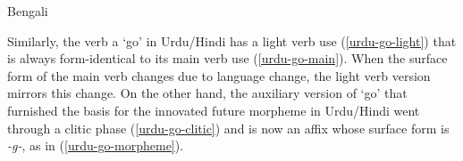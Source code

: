 \documentclass[output=paper,hidelinks]{langscibook}
\begin{document}
\begin{exe} 
\ex \label{bangla-be} Bengali
\begin{xlist}
\end{xlist}
\end{exe}

Similarly, the verb {\textdyoghlig}a `go' in Urdu/Hindi has a light verb use (\ref{urdu-go-light}) that is always form-identical to its main verb use (\ref{urdu-go-main}).  When the surface form of the main verb changes due to language change, the light verb version mirrors this change.  On the other hand, the auxiliary version of `go' that furnished the basis for the innovated future morpheme in Urdu/Hindi went through a clitic phase (\ref{urdu-go-clitic}) and is now an affix whose surface form is \textit{-g-}, as in (\ref{urdu-go-morpheme}).
\end{document}

